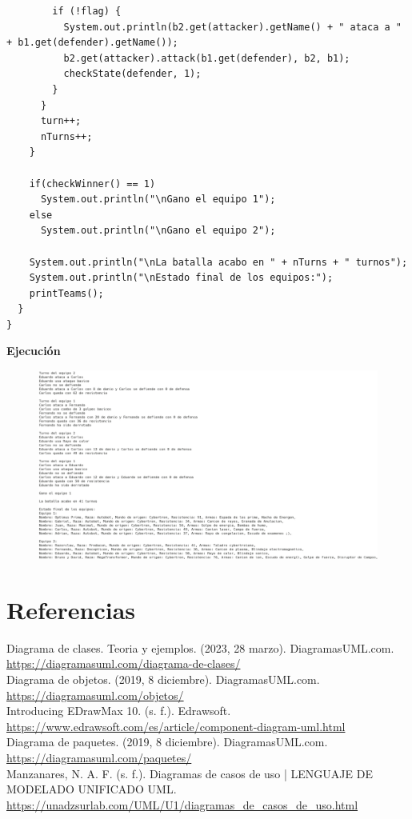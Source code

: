 \documentclass[12pt]{article}
\begin{document}
\begin{enumerate}[label = \arabic{enumi}]
\begin{lstlisting}
        if (!flag) {
          System.out.println(b2.get(attacker).getName() + " ataca a " + b1.get(defender).getName());
          b2.get(attacker).attack(b1.get(defender), b2, b1);
          checkState(defender, 1);
        }
      }
      turn++;
      nTurns++;
    }

    if(checkWinner() == 1)
      System.out.println("\nGano el equipo 1");
    else 
      System.out.println("\nGano el equipo 2");
    
    System.out.println("\nLa batalla acabo en " + nTurns + " turnos");
    System.out.println("\nEstado final de los equipos:");
    printTeams();
  }
}    
    \end{lstlisting}  

    \textbf{Ejecución}
    \begin{figure}[ht]
      \includegraphics[width = \textwidth, center]{transformers.png}
    \end{figure}
  \end{enumerate}

  \section*{Referencias}
  Diagrama de clases. Teoria y ejemplos. (2023, 28 marzo). DiagramasUML.com. \url{https://diagramasuml.com/diagrama-de-clases/} \\

  Diagrama de objetos. (2019, 8 diciembre). DiagramasUML.com. \url{https://diagramasuml.com/objetos/} \\

  Introducing EDrawMax 10. (s. f.). Edrawsoft. \url{https://www.edrawsoft.com/es/article/component-diagram-uml.html} \\

  Diagrama de paquetes. (2019, 8 diciembre). DiagramasUML.com. \url{https://diagramasuml.com/paquetes/} \\

  Manzanares, N. A. F. (s. f.). Diagramas de casos de uso | LENGUAJE DE MODELADO UNIFICADO UML. \url{https://unadzsurlab.com/UML/U1/diagramas_de_casos_de_uso.html}
\end{document}
